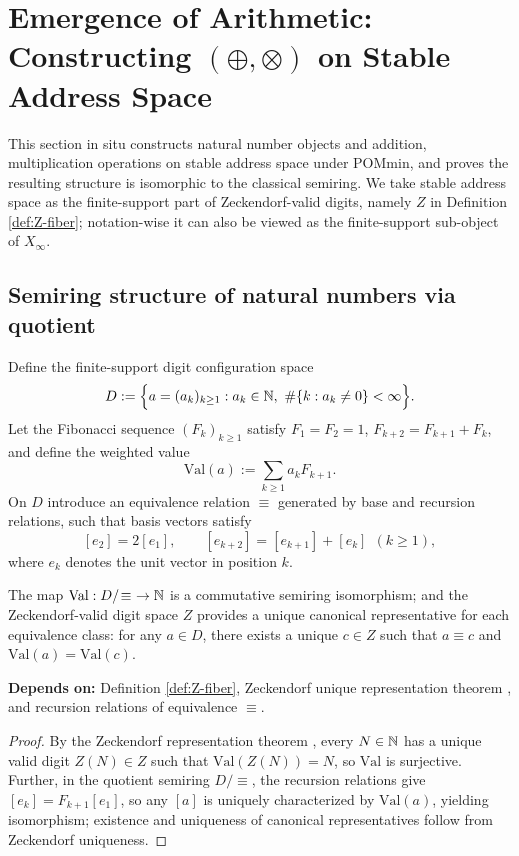\section{Emergence of Arithmetic: Constructing $(\oplus,\otimes)$ on Stable Address Space}\label{sec:emergent-arithmetic}

This section in situ constructs natural number objects and addition, multiplication operations on stable address space under POMmin, and proves the resulting structure is isomorphic to the classical semiring. We take stable address space as the finite-support part of Zeckendorf-valid digits, namely $Z$ in Definition \ref{def:Z-fiber}; notation-wise it can also be viewed as the finite-support sub-object of $X_\infty$.\par

\subsection{Semiring structure of natural numbers via quotient}
Define the finite-support digit configuration space
$$
D:=\Bigl\{a=(a_k)_{k\ge 1}: a_k\in\NN,\ \#\{k:a_k\neq 0\}<\infty\Bigr\}.
$$
Let the Fibonacci sequence $(F_k)_{k\ge 1}$ satisfy $F_1=F_2=1$, $F_{k+2}=F_{k+1}+F_k$, and define the weighted value
$$
\mathrm{Val}(a):=\sum_{k\ge 1} a_k F_{k+1}.
$$
On $D$ introduce an equivalence relation $\equiv$ generated by base and recursion relations, such that basis vectors satisfy
$$
[e_2]=2[e_1],\qquad [e_{k+2}]=[e_{k+1}]+[e_k]\ \ (k\ge 1),
$$
where $e_k$ denotes the unit vector in position $k$.\par

\begin{theorem}\label{thm:emergent-N}
The map $\mathrm{Val}:D/\!\equiv\ \to \mathbb{N}$ is a commutative semiring isomorphism; and the Zeckendorf-valid digit space $Z$ provides a unique canonical representative for each equivalence class: for any $a\in D$, there exists a unique $c\in Z$ such that $a\equiv c$ and $\mathrm{Val}(a)=\mathrm{Val}(c)$.\par
\noindent\textnormal{\textbf{Depends on:} Definition \ref{def:Z-fiber}, Zeckendorf unique representation theorem \cite{Zeckendorf1972}, and recursion relations of equivalence $\equiv$.}\par
\end{theorem}

\begin{proof}
By the Zeckendorf representation theorem \cite{Zeckendorf1972}, every $N\in\mathbb{N}$ has a unique valid digit $Z(N)\in Z$ such that $\mathrm{Val}(Z(N))=N$, so $\mathrm{Val}$ is surjective. Further, in the quotient semiring $D/\!\equiv$, the recursion relations give $[e_k]=F_{k+1}[e_1]$, so any $[a]$ is uniquely characterized by $\mathrm{Val}(a)$, yielding isomorphism; existence and uniqueness of canonical representatives follow from Zeckendorf uniqueness.\par
\end{proof}

